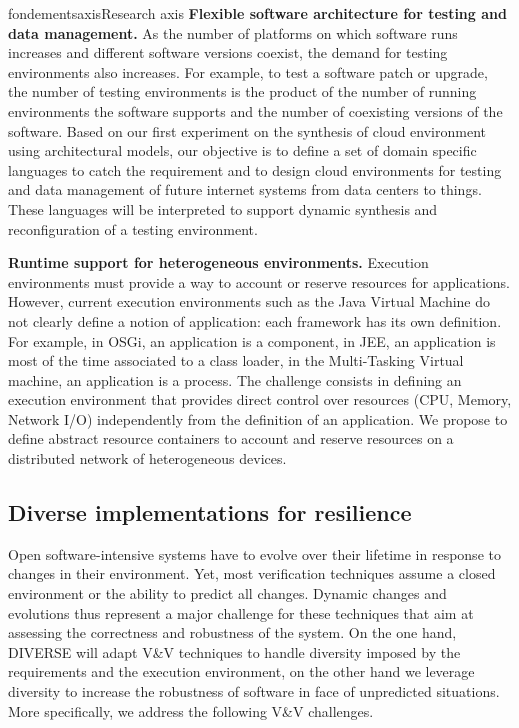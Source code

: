 \documentclass{ra2018}
\newcommand{\team}{DIVERSE}
\begin{document}
\begin{module}{fondements}{axis}{Research axis}
\textbf{Flexible software architecture for testing and data management.} As the number of  platforms on which software runs increases and different software versions coexist, the demand for testing environments also increases. For example, to test a  software patch or upgrade, the number of testing environments  is the product of the number of running environments the  software supports and the number of coexisting versions of the  software.  
Based on our first experiment on the synthesis of cloud environment using architectural models, our objective is to define a set of domain specific languages to catch the requirement and to design cloud environments for testing and data management of future internet systems from data centers to things. These languages will be interpreted to support dynamic synthesis and reconfiguration of a testing environment.

\textbf{Runtime support for heterogeneous environments.}
Execution environments must provide a way to account or reserve resources for applications. However, current execution environments such as the Java Virtual Machine do not clearly define a notion of application: each framework has its own definition. 
For example, in OSGi, an application is a component, in JEE, an application is most of the time associated to a class loader, in the Multi-Tasking Virtual machine, an application is a process. 
The challenge consists in defining an execution environment that provides direct control over resources (CPU, Memory, Network I/O) independently from the definition of an application. 
We propose to define abstract resource containers to account and reserve resources on a distributed network of heterogeneous devices.

\subsection{Diverse implementations for resilience}
\label{sec:axis-implementation}

Open software-intensive systems have to evolve over their lifetime in response to changes in their environment. Yet, most verification techniques assume a closed environment or the ability to predict all changes. Dynamic changes and evolutions thus represent a major challenge for these techniques that aim at assessing the correctness and robustness of the system. On the one hand, \team{} will adapt V\&V techniques to handle diversity imposed by the requirements and the execution environment, on the other hand we leverage diversity to increase the robustness of software in face of unpredicted situations. More specifically, we address the following V\&V challenges.


\end{module}
\end{document}

